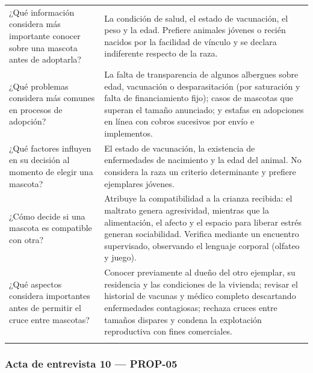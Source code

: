 \documentclass[journal,onecolumn]{IEEEtran}
\begin{document}
{\begin{longtable}{@{}p{5.6cm} p{9.4cm}@{}}
			¿Qué información considera más importante conocer sobre una mascota antes de adoptarla? & La condición de salud, el estado de vacunación, el peso y la edad. Prefiere animales jóvenes o recién nacidos por la facilidad de vínculo y se declara indiferente respecto de la raza. \\ \addlinespace
			
			¿Qué problemas considera más comunes en procesos de adopción? & La falta de transparencia de algunos albergues sobre edad, vacunación o desparasitación (por saturación y falta de financiamiento fijo); casos de mascotas que superan el tamaño anunciado; y estafas en adopciones en línea con cobros sucesivos por envío e implementos. \\ \addlinespace
			
			¿Qué factores influyen en su decisión al momento de elegir una mascota? & El estado de vacunación, la existencia de enfermedades de nacimiento y la edad del animal. No considera la raza un criterio determinante y prefiere ejemplares jóvenes. \\ \addlinespace
			
			¿Cómo decide si una mascota es compatible con otra? & Atribuye la compatibilidad a la crianza recibida: el maltrato genera agresividad, mientras que la alimentación, el afecto y el espacio para liberar estrés generan sociabilidad. Verifica mediante un encuentro supervisado, observando el lenguaje corporal (olfateo y juego). \\ \addlinespace
			
			¿Qué aspectos considera importantes antes de permitir el cruce entre mascotas? & Conocer previamente al dueño del otro ejemplar, su residencia y las condiciones de la vivienda; revisar el historial de vacunas y médico completo descartando enfermedades contagiosas; rechaza cruces entre tamaños dispares y condena la explotación reproductiva con fines comerciales. \\ \addlinespace
			
		\end{longtable}
	}
	
	
	\subsubsection*{Acta de entrevista 10 --- PROP-05}
	
\end{document}
